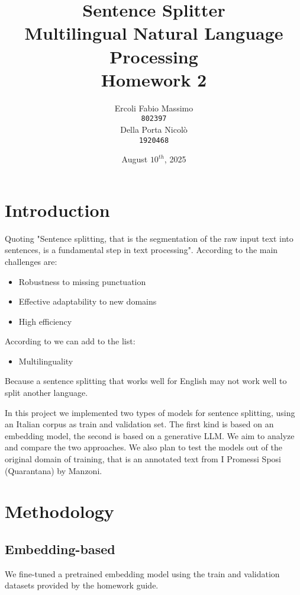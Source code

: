 \documentclass[11pt]{article}
\title{%
	Sentence Splitter\\
	\large Multilingual Natural Language Processing \\
	Homework 2}
\date{August $10^{th}$, 2025}
\author{Ercoli Fabio Massimo \\
\texttt{802397} \\\And
Della Porta Nicolò \\
\texttt{1920468} \\}
\begin{document}
\maketitle

\section{Introduction}

Quoting \cite{redaelli-sprugnoli-2024-sentence} "Sentence splitting, that is the segmentation of the raw input text into sentences, is a fundamental step in text processing".  According to \cite{frohmann2024segmenttextuniversalapproach} the main challenges are:

\begin{itemize}
	\item Robustness to missing punctuation
	\item Effective adaptability to new domains
	\item High efficiency
\end{itemize}

According to \cite{redaelli-sprugnoli-2024-sentence} we can add to the list:

\begin{itemize}
	\item Multilinguality
\end{itemize}

Because a sentence splitting that works well for English may not work well to split another language.

In this project we implemented two types of models for sentence splitting, using an Italian corpus as train and validation set.
The first kind is based on an embedding model, the second is based on a generative LLM.
We aim to analyze and compare the two approaches. 
We also plan to test the models out of the original domain of training, that is an annotated text from I Promessi Sposi (Quarantana) by Manzoni.

\section{Methodology}

\subsection{Embedding-based}

We fine-tuned a pretrained embedding model using the train and validation datasets provided by the homework guide.
\end{document}

